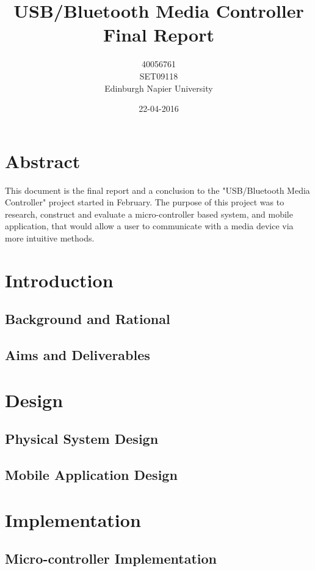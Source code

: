 \documentclass{article}
\title{USB/Bluetooth Media Controller\\Final Report}
\author{40056761\\SET09118\\Edinburgh Napier University}
\date{22-04-2016}
\begin{document}
		
	\maketitle
	
	\section{Abstract}
		This document is the final report and a conclusion to the "USB/Bluetooth Media Controller" project started in February. The purpose of this project was to research, construct and evaluate a micro-controller based system, and mobile application, that would allow a user to communicate with a media device via more intuitive methods. 
				
	\newpage
		
		
	\tableofcontents
	
	\newpage
		
	\section{Introduction}
		\subsection{Background and Rational}
		
		\subsection{Aims and Deliverables}
	
	\section{Design}
		\subsection{Physical System Design}
		
		\subsection{Mobile Application Design}

	\section{Implementation}
		\subsection{Micro-controller Implementation}
\end{document}
